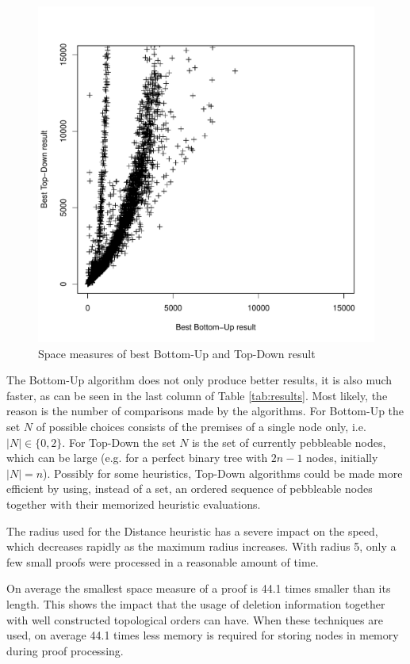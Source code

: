 
\begin{figure}
	\centering
	\includegraphics[scale=0.45]{figures/Fig7.pdf}
	\caption{Space measures of best Bottom-Up and Top-Down result}
	\label{fig:BUvsTD}
\end{figure}

The Bottom-Up algorithm does not only produce better results, it is also much faster, as can be seen in the last column of Table \ref{tab:results}. 
Most likely, the reason is the number of comparisons made by the algorithms. 
For Bottom-Up the set $N$ of possible choices consists of the premises of a single node only, i.e. $|N| \in \{0,2\}$.
For Top-Down the set $N$ is the set of currently pebbleable nodes, which can be large (e.g. for a perfect binary tree with $2n -1$ nodes, initially $|N| = n$). 
Possibly for some heuristics, Top-Down algorithms could be made more efficient by using, instead of a set, an ordered sequence of pebbleable nodes together with their memorized heuristic evaluations.

The radius used for the Distance heuristic has a severe impact on the speed, which decreases rapidly as the maximum radius increases. 
With radius 5, only a few small proofs were processed in a reasonable amount of time.

On average the smallest space measure of a proof is 44.1 times smaller than its length. 
This shows the impact that the usage of deletion information together with well constructed topological orders can have. 
When these techniques are used, on average 44.1 times less memory is required for storing nodes in memory during proof processing.
